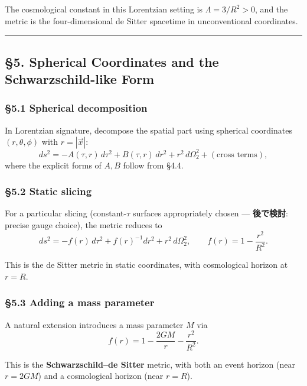 \documentclass[a4paper,11pt]{article}
\theoremstyle{definition}
\begin{document}
The cosmological constant in this Lorentzian setting is
\(\Lambda = 3/R^2 > 0\), and the metric is the four-dimensional de
Sitter spacetime in unconventional coordinates.

\begin{center}\rule{0.5\linewidth}{0.5pt}\end{center}

\subsection{§5. Spherical Coordinates and the Schwarzschild-like
Form}\label{spherical-coordinates-and-the-schwarzschild-like-form}

\subsubsection{§5.1 Spherical
decomposition}\label{spherical-decomposition}

In Lorentzian signature, decompose the spatial part using spherical
coordinates \((r, \theta, \phi)\) with \(r = |\vec{x}|\):
\[ds^2 = -A(\tau, r)\, d\tau^2 + B(\tau, r)\, dr^2 + r^2\, d\Omega_2^2 + (\text{cross terms}),\]
where the explicit forms of \(A, B\) follow from §4.4.

\subsubsection{§5.2 Static slicing}\label{static-slicing}

For a particular slicing (constant-\(\tau\) surfaces appropriately
chosen --- \textbf{後で検討}: precise gauge choice), the metric reduces
to
\[ds^2 = -f(r)\, d\tau^2 + f(r)^{-1} dr^2 + r^2\, d\Omega_2^2, \qquad f(r) = 1 - \frac{r^2}{R^2}.\]

This is the de Sitter metric in static coordinates, with cosmological
horizon at \(r = R\).

\subsubsection{§5.3 Adding a mass
parameter}\label{adding-a-mass-parameter}

A natural extension introduces a mass parameter \(M\) via
\[f(r) = 1 - \frac{2GM}{r} - \frac{r^2}{R^2}.\]

This is the \textbf{Schwarzschild--de Sitter} metric, with both an event
horizon (near \(r = 2GM\)) and a cosmological horizon (near \(r = R\)).
\end{document}
